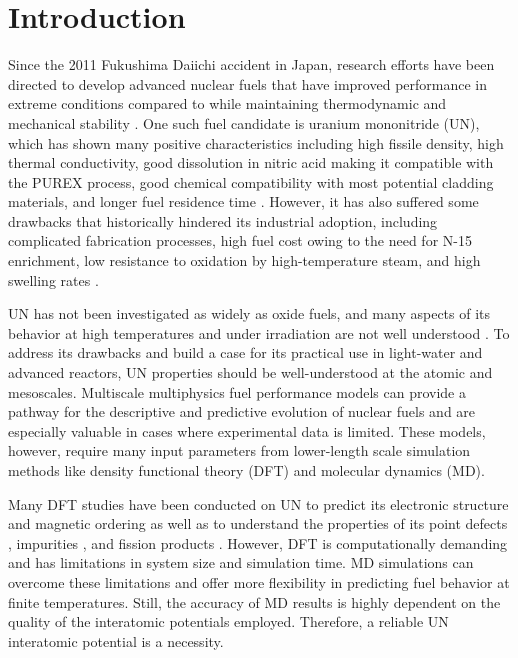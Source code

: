 \documentclass[preprint, 12pt]{elsarticle}
\begin{document}
\linenumbers

\section{Introduction}

Since the 2011 Fukushima Daiichi accident in Japan, research efforts have been directed to develop advanced nuclear fuels that have improved performance in extreme conditions compared to  while maintaining thermodynamic and mechanical stability \cite{Watkins2021}. One such fuel candidate is uranium mononitride (UN), which has shown many positive characteristics including high fissile density, high thermal conductivity, good dissolution in nitric acid making it compatible with the PUREX process, good chemical compatibility with most potential cladding materials, and longer fuel residence time \cite{Ekberg2018, Wallenius2020, Uno2020}. However, it has also suffered some drawbacks that historically hindered its industrial adoption, including complicated fabrication processes, high fuel cost owing to the need for N-15 enrichment, low resistance to oxidation by high-temperature steam, and high swelling rates \cite{Ekberg2018, Wallenius2020, Uno2020}.

UN has not been investigated as widely as oxide fuels, and many aspects of its behavior at high temperatures and under irradiation are not well understood \cite{Casagranda2020}. To address its drawbacks and build a case for its practical use in light-water and advanced reactors, UN properties should be well-understood at the atomic and mesoscales. Multiscale multiphysics fuel performance models can provide a pathway for the descriptive and predictive evolution of nuclear fuels and are especially valuable in cases where experimental data is limited. These models, however, require many input parameters from lower-length scale simulation methods like density functional theory (DFT) and molecular dynamics (MD).

Many DFT studies have been conducted on UN to predict its electronic structure and magnetic ordering \cite{Samsel2007, Evarestov2008, Gryaznov2012, Mei2013, Kocevski2022I} as well as to understand the properties of its point defects \cite{Kotomin2007, Kotomin2009, Bocharov2011, Lan2013}, impurities \cite{Kotomin2008}, and fission products \cite{Klipfel2012, Claisse2016, Zhang2015, Yang2021}. However, DFT is computationally demanding and has limitations in system size and simulation time. MD simulations can overcome these limitations and offer more flexibility in predicting fuel behavior at finite temperatures. Still, the accuracy of MD results is highly dependent on the quality of the interatomic potentials employed. Therefore, a reliable UN interatomic potential is a necessity.
\end{document}
